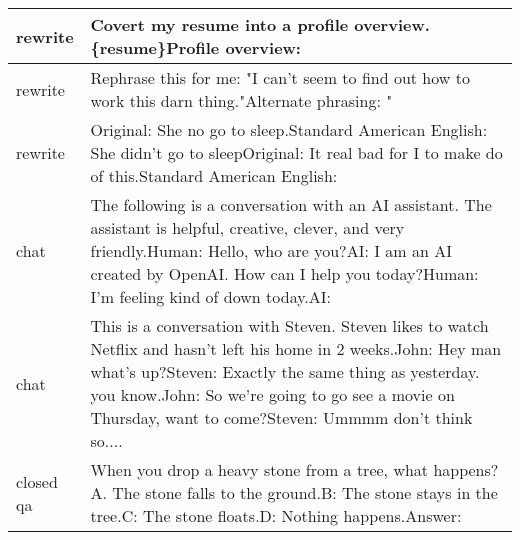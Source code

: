 \begin{longtable}{p{} p{}}
       rewrite &                                                                                                                                                                                                                         Covert my resume into a profile overview.{\newline}\{resume\}{\newline}Profile overview: \\ \midrule
       rewrite &                                                                                                                                                                                           Rephrase this for me: "I can't seem to find out how to work this darn thing."{\newline}Alternate phrasing: " \\ \midrule
       rewrite &                                                                                                                                Original: She no go to sleep.{\newline}Standard American English: She didn't go to sleep{\newline}{\newline}Original: It real bad for I to make do of this.{\newline}Standard American English: \\ \midrule
          chat &                                   The following is a conversation with an AI assistant. The assistant is helpful, creative, clever, and very friendly.{\newline}{\newline}Human: Hello, who are you?{\newline}AI: I am an AI created by OpenAI. How can I help you today?{\newline}Human: I'm feeling kind of down today.{\newline}AI: \\ \midrule
          chat &  This is a conversation with Steven. Steven likes to watch Netflix and hasn't left his home in 2 weeks.{\newline}John: Hey man what's up?{\newline}Steven: Exactly the same thing as yesterday. you know.{\newline}John: So we're going to go see a movie on Thursday, want to come?{\newline}Steven: Ummmm don't think so.... \\ \midrule
     closed qa &                                                                                                              When you drop a heavy stone from a tree, what happens? {\newline}A. The stone falls to the ground.{\newline}B: The stone stays in the tree.{\newline}C: The stone floats.{\newline}D: Nothing happens.{\newline}{\newline}Answer: \\ \midrule

\end{longtable}
